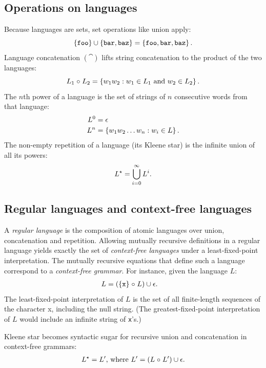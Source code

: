 \subsection{Operations on languages}
Because languages are sets, set operations like union apply:
\begin{equation*}
  \left\{\tt foo\right\} \cup \left\{{\tt bar}, {\tt baz}\right\} = 
  \left\{{\tt foo}, {\tt bar}, {\tt baz}\right\}
  \text.
\end{equation*}
%
Language concatenation $(\cat)$ lifts string concatenation to the product of
the two languages:
%
\begin{equation*}
  L_1 \mathrel{\circ} L_2 =
  \left\{  w_1 w_2  :  w_1 \in L_1 \text{ and } w_2 \in L_2 \right\}
  \text.
\end{equation*}
%
The $n$th power of a language is the set of strings of $n$ consecutive words
from that language:
\begin{align*}
  L^0 &= \epsilon
  \\
  L^n &= \left\{  w_1w_2 \ldots w_n  :  w_i \in L\right\} 
  \text.
\end{align*}
%
The non-empty repetition of a language (its Kleene star) is the infinite union
of all its powers:
\begin{equation*}
  L^\star = \bigcup_{i = 0}^\infty L^i
  \text.
\end{equation*}
%


\subsection{Regular languages and context-free languages}
A \emph{regular language} is 
the composition of atomic languages over union, concatenation and
repetition.
%
Allowing mutually recursive definitions in a regular language yields exactly
the set of \emph{context-free languages} under a least-fixed-point
interpretation.
%
The mutually recursive equations that define such a language correspond to a 
\emph{context-free grammar}.
%
For instance, given the language $L$:
\begin{align*}
  L &= (\left\{\tt x\right\} \mathrel{\circ} L)
    \cup \epsilon
  \text.
\end{align*}
%
The least-fixed-point interpretation of $L$ is the set of all finite-length
sequences of the character x, including the null string.
%
(The greatest-fixed-point interpretation of $L$ would include an infinite
string of {\tt x}'s.)


Kleene star becomes syntactic sugar for recursive union and concatenation in
context-free grammars:
%
\begin{align*}
   L^\star = L'\text{, where }
   L' = (L \mathrel{\circ} L') \cup \epsilon
   \text.
\end{align*}


